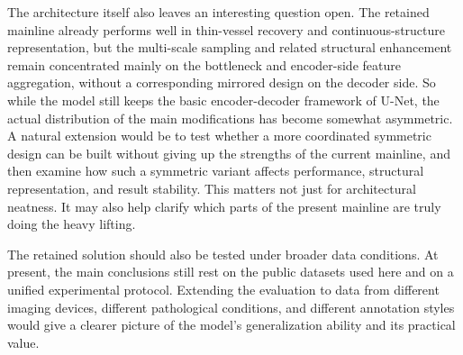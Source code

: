 \documentclass[a4paper,11pt]{article}
\begin{document}
The architecture itself also leaves an interesting question open. The retained mainline already performs well in thin-vessel recovery and continuous-structure representation, but the multi-scale sampling and related structural enhancement remain concentrated mainly on the bottleneck and encoder-side feature aggregation, without a corresponding mirrored design on the decoder side. So while the model still keeps the basic encoder-decoder framework of U-Net, the actual distribution of the main modifications has become somewhat asymmetric. A natural extension would be to test whether a more coordinated symmetric design can be built without giving up the strengths of the current mainline, and then examine how such a symmetric variant affects performance, structural representation, and result stability. This matters not just for architectural neatness. It may also help clarify which parts of the present mainline are truly doing the heavy lifting.

The retained solution should also be tested under broader data conditions. At present, the main conclusions still rest on the public datasets used here and on a unified experimental protocol. Extending the evaluation to data from different imaging devices, different pathological conditions, and different annotation styles would give a clearer picture of the model's generalization ability and its practical value.

\clearpage


\end{document}
